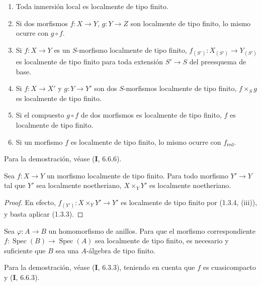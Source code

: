 \begin{proposition}[1.3.4]
\label{IV.1.3.4-fr}
\begin{enumerate}
  \item[\textup{(i)}] Toda inmersión local es localmente de tipo finito.
  \item[\textup{(ii)}] Si dos morfismos $f:X\to Y$, $g:Y\to Z$ son localmente de
  tipo finito, lo mismo ocurre con $g\circ f$.
  \item[\textup{(iii)}] Si $f:X\to Y$ es un $S$-morfismo localmente de tipo finito,
  $f_{(S')}:X_{(S')}\to Y_{(S')}$ es localmente de tipo finito para toda
  extensión $S'\to S$ del preesquema de base.
  \item[\textup{(iv)}] Si $f:X\to X'$ y $g:Y\to Y'$ son dos $S$-morfismos
  localmente de tipo finito, $f\times_Sg$ es localmente de tipo finito.
  \item[\textup{(v)}] Si el compuesto $g\circ f$ de dos morfismos es localmente de
  tipo finito, $f$ es localmente de tipo finito.
  \item[\textup{(vi)}] Si un morfismo $f$ es localmente de tipo finito, lo mismo
  ocurre con $f_{\mathrm{red}}$.
\end{enumerate}
\end{proposition}

Para la demostración, véase (\textbf{I}, 6.6.6).

\begin{corollary}[1.3.5]
\label{IV.1.3.5-fr}
Sea $f:X\to Y$ un morfismo localmente de tipo finito. Para todo morfismo
$Y'\to Y$ tal que $Y'$ sea localmente noetheriano, $X\times_YY'$ es
localmente noetheriano.
\end{corollary}

\begin{proof}
En efecto, $f_{(Y')}:X\times_YY'\to Y'$ es localmente de tipo finito por
(1.3.4, (iii)), y basta aplicar (1.3.3).
\end{proof}

\begin{proposition}[1.3.6]
\label{IV.1.3.6-fr}
Sea $\varphi:A\to B$ un homomorfismo de anillos. Para que el morfismo
correspondiente $f:\operatorname{Spec}(B)\to\operatorname{Spec}(A)$ sea localmente de tipo finito, es necesario y
suficiente que $B$ sea una $A$-álgebra de tipo finito.
\end{proposition}

Para la demostración, véase (\textbf{I}, 6.3.3), teniendo en cuenta que $f$ es
cuasicompacto y (\textbf{I}, 6.6.3).


